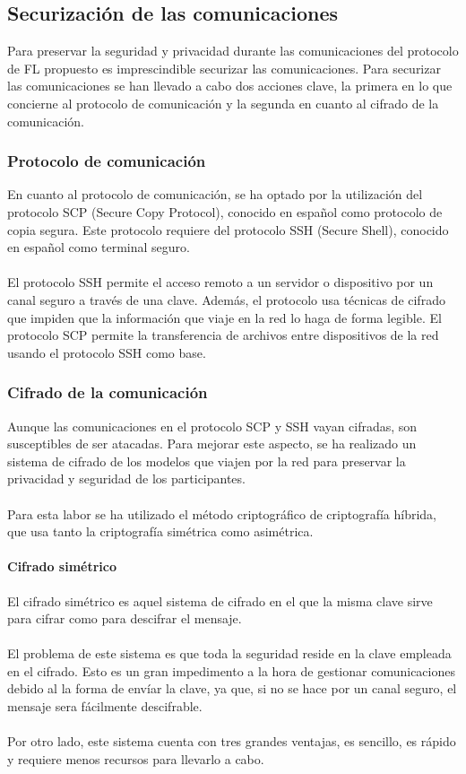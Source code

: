 \subsection{Securización de las comunicaciones} \label{SegCom}
Para preservar la seguridad y privacidad durante las comunicaciones del protocolo de FL propuesto es imprescindible securizar las comunicaciones. Para securizar las comunicaciones se han llevado a cabo dos acciones clave, la primera en lo que concierne al protocolo de comunicación y la segunda en cuanto al cifrado de la comunicación.

\subsubsection{Protocolo de comunicación}
En cuanto al protocolo de comunicación, se ha optado por la utilización del protocolo SCP (Secure Copy Protocol), conocido en español como protocolo de copia segura. Este protocolo requiere del protocolo SSH (Secure Shell), conocido en español como terminal seguro.
\\ \\
El protocolo SSH permite el acceso remoto a un servidor o dispositivo por un canal seguro a través de una clave. Además, el protocolo usa técnicas de cifrado que impiden que la información que viaje en la red lo haga de forma legible. El protocolo SCP permite la transferencia de archivos entre dispositivos de la red usando el protocolo SSH como base.

\subsubsection{Cifrado de la comunicación}
Aunque las comunicaciones en el protocolo SCP y SSH vayan cifradas, son susceptibles de ser atacadas. Para mejorar este aspecto, se ha realizado un sistema de cifrado de los modelos que viajen por la red para preservar la privacidad y seguridad de los participantes.
\\ \\ 
Para esta labor se ha utilizado el método criptográfico de criptografía híbrida, que usa tanto la criptografía simétrica como asimétrica.

\paragraph{Cifrado simétrico} 
El cifrado simétrico es aquel sistema de cifrado en el que la misma clave sirve para cifrar como para descifrar el mensaje. 
\\ \\
El problema de este sistema es que toda la seguridad reside en la clave empleada en el cifrado. Esto es un gran impedimento a la hora de gestionar comunicaciones debido al la forma de envíar la clave, ya que, si no se hace por un canal seguro, el mensaje sera fácilmente descifrable.
\\ \\
Por otro lado, este sistema cuenta con tres grandes ventajas, es sencillo, es rápido y requiere menos recursos para llevarlo a cabo.

